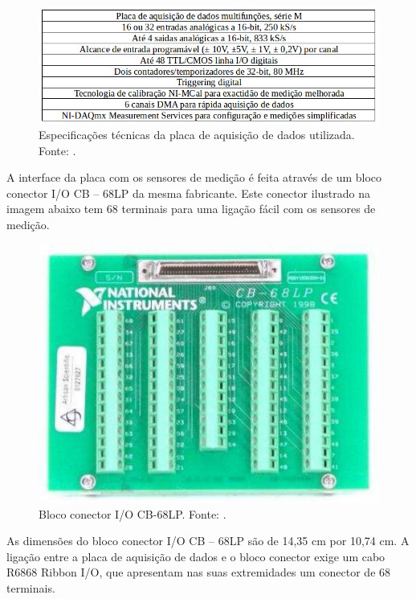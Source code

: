 	\begin{figure}[!ht]
	  \centering
	  \includegraphics[scale=0.6]{editaveis/figuras/placa_aquisicao_spec}
	  \caption[Especificações técnicas da placa de aquisição de dados utilizada]
	      {Especificações técnicas da placa de aquisição de dados utilizada. Fonte: \cite{national04}.}
	\label{placa_aquisicao_spec}
	\end{figure}
	
	A interface da placa com os sensores de medição é feita através de um bloco conector I/O CB – 68LP da mesma fabricante. Este conector ilustrado na imagem abaixo tem 68 terminais para uma ligação fácil com os sensores de medição.
    
	\begin{figure}[!ht]
	  \centering
	  \includegraphics[scale=0.5]{editaveis/figuras/bloco_conector_placa_aquisicao}
	  \caption[Bloco conector I/O CB-68LP]
	      {Bloco conector I/O CB-68LP. Fonte: \cite{national04}.}
	\label{bloco_conector_placa_aquisicao}
	\end{figure}
	
	As dimensões do bloco conector I/O CB – 68LP são de 14,35 cm por 10,74 cm. A ligação entre a placa de aquisição de dados e o bloco conector exige um cabo R6868 Ribbon I/O, que apresentam nas suas extremidades um conector de 68 terminais. 
	
